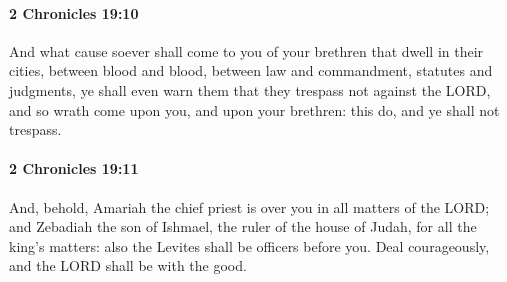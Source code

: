		\paragraph{2 Chronicles 19:10} %
			\label{2CHRONICLES-19-10}

			And what cause soever shall come to you of your brethren that dwell in their cities, between blood and blood, between law and commandment, statutes and judgments, ye shall even warn them that they trespass not against the LORD, and so wrath come upon you, and upon your brethren: this do, and ye shall not trespass.


		\paragraph{2 Chronicles 19:11} %
			\label{2CHRONICLES-19-11}

			And, behold, Amariah the chief priest is over you in all matters of the LORD; and Zebadiah the son of Ishmael, the ruler of the house of Judah, for all the king's matters: also the Levites shall be officers before you. Deal courageously, and the LORD shall be with the good.

